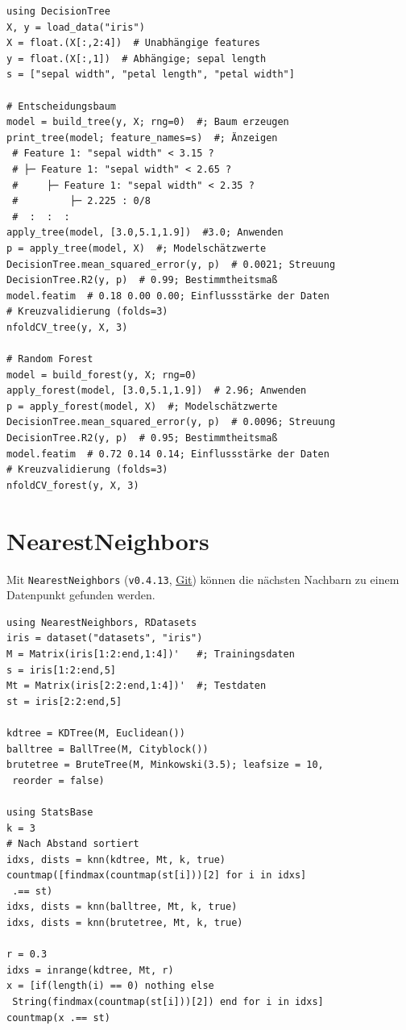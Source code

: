 \documentclass[10pt,twocolumn]{scrartcl}
\begin{document}
\begin{lstlisting}
using DecisionTree
X, y = load_data("iris")
X = float.(X[:,2:4])  # Unabhängige features
y = float.(X[:,1])  # Abhängige; sepal length
s = ["sepal width", "petal length", "petal width"]

# Entscheidungsbaum
model = build_tree(y, X; rng=0)  #; Baum erzeugen
print_tree(model; feature_names=s)  #; Änzeigen
 # Feature 1: "sepal width" < 3.15 ?
 # ├─ Feature 1: "sepal width" < 2.65 ?
 #     ├─ Feature 1: "sepal width" < 2.35 ?
 #         ├─ 2.225 : 0/8
 #  :  :  :
apply_tree(model, [3.0,5.1,1.9])  #3.0; Anwenden
p = apply_tree(model, X)  #; Modelschätzwerte
DecisionTree.mean_squared_error(y, p)  # 0.0021; Streuung
DecisionTree.R2(y, p)  # 0.99; Bestimmtheitsmaß
model.featim  # 0.18 0.00 0.00; Einflussstärke der Daten
# Kreuzvalidierung (folds=3)
nfoldCV_tree(y, X, 3)

# Random Forest
model = build_forest(y, X; rng=0)
apply_forest(model, [3.0,5.1,1.9])  # 2.96; Anwenden
p = apply_forest(model, X)  #; Modelschätzwerte
DecisionTree.mean_squared_error(y, p)  # 0.0096; Streuung
DecisionTree.R2(y, p)  # 0.95; Bestimmtheitsmaß
model.featim  # 0.72 0.14 0.14; Einflussstärke der Daten
# Kreuzvalidierung (folds=3)
nfoldCV_forest(y, X, 3)
\end{lstlisting}

\section{NearestNeighbors}

Mit \lstinline|NearestNeighbors| (\lstinline|v0.4.13|,
\href{https://github.com/KristofferC/NearestNeighbors.jl}{Git}) können die nächsten Nachbarn zu einem Datenpunkt gefunden werden.

\begin{lstlisting}
using NearestNeighbors, RDatasets
iris = dataset("datasets", "iris")
M = Matrix(iris[1:2:end,1:4])'   #; Trainingsdaten
s = iris[1:2:end,5]
Mt = Matrix(iris[2:2:end,1:4])'  #; Testdaten
st = iris[2:2:end,5]

kdtree = KDTree(M, Euclidean())
balltree = BallTree(M, Cityblock())
brutetree = BruteTree(M, Minkowski(3.5); leafsize = 10,
 reorder = false)

using StatsBase
k = 3
# Nach Abstand sortiert
idxs, dists = knn(kdtree, Mt, k, true)
countmap([findmax(countmap(st[i]))[2] for i in idxs]
 .== st)
idxs, dists = knn(balltree, Mt, k, true)
idxs, dists = knn(brutetree, Mt, k, true)

r = 0.3
idxs = inrange(kdtree, Mt, r)
x = [if(length(i) == 0) nothing else
 String(findmax(countmap(st[i]))[2]) end for i in idxs]
countmap(x .== st)
\end{lstlisting}


\end{document}
